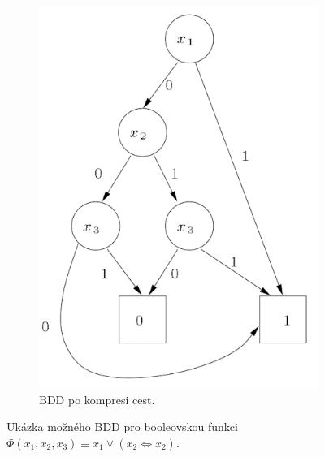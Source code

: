 \begin{figure}
\begin{subfigure}{.45\textwidth}
        \includegraphics[scale=0.7]{obrazky-figures/bdd_b.png}
        \caption{BDD po kompresi cest.}
        \label{bdd_example_b}
    \end{subfigure}
    \caption{Ukázka možného BDD pro booleovskou funkci $ \Phi (x_1,x_2,x_3) \equiv x_1 \vee (x_2 \Leftrightarrow x_2) $.}
    \label{bdd_example}
\end{figure}


